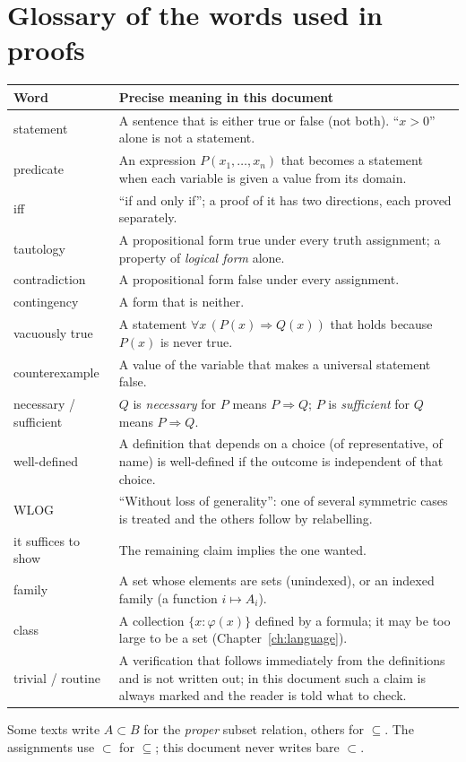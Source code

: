 \section*{Glossary of the words used in proofs}

\begin{longtable}{@{}p{3.6cm}p{11cm}@{}}
	\toprule
	\textbf{Word} & \textbf{Precise meaning in this document}\\
	\midrule
	\endhead
	statement & A sentence that is either true or false (not both). ``$x>0$'' alone is not a statement.\\
	predicate & An expression $P(x_1,\dots,x_n)$ that becomes a statement when each variable is given a value from its domain.\\
	iff & ``if and only if''; a proof of it has two directions, each proved separately.\\
	tautology & A propositional form true under every truth assignment; a property of \emph{logical form} alone.\\
	contradiction & A propositional form false under every assignment.\\
	contingency & A form that is neither.\\
	vacuously true & A statement $\forall x\,(P(x)\Rightarrow Q(x))$ that holds because $P(x)$ is never true.\\
	counterexample & A value of the variable that makes a universal statement false.\\
	necessary / sufficient & $Q$ is \emph{necessary} for $P$ means $P\Rightarrow Q$; $P$ is \emph{sufficient} for $Q$ means $P\Rightarrow Q$.\\
	well-defined & A definition that depends on a choice (of representative, of name) is well-defined if the outcome is independent of that choice.\\
	WLOG & ``Without loss of generality'': one of several symmetric cases is treated and the others follow by relabelling.\\
	it suffices to show & The remaining claim implies the one wanted.\\
	family & A set whose elements are sets (unindexed), or an indexed family (a function $i\mapsto A_i$).\\
	class & A collection $\{x:\varphi(x)\}$ defined by a formula; it may be too large to be a set (Chapter~\ref{ch:language}).\\
	trivial / routine & A verification that follows immediately from the definitions and is not written out; in this document such a claim is always marked and the reader is told what to check.\\
	\bottomrule
\end{longtable}

\begin{warning}
	Some texts write $A\subset B$ for the \emph{proper} subset relation, others for $\subseteq$. The assignments use $\subset$ for $\subseteq$; this document never writes bare $\subset$.
\end{warning}